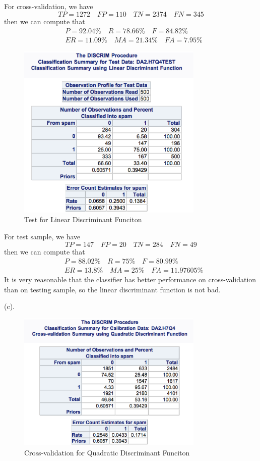 \documentclass[letterpaper, 12pt]{article}
\newcommand{\ba}{$$\begin{aligned}}
\newcommand{\ea}{\end{aligned}$$}
\begin{document}
For cross-validation, we have
$$
TP=1272\quad FP=110\quad TN=2374\quad FN=345
$$
then we can compute that
\ba
&P=92.04\%\quad R=78.66\%\quad F=84.82\%\\
&ER=11.09\%\quad MA=21.34\%\quad FA=7.95\%
\ea
\begin{figure}[htbp]
\centering\includegraphics[width=3.5in]{7-11.eps}
\caption{Test for Linear Discriminant Funciton}\label{11}
\end{figure}

For test sample, we have
$$
TP=147\quad FP=20\quad TN=284\quad FN=49
$$
then we can compute that
\ba
&P=88.02\%\quad R=75\%\quad F=80.99\%\\
&ER=13.8\%\quad MA=25\%\quad FA=11.97605\%
\ea
It is very reasonable that the classifier has better performance on cross-validation than on testing sample, so the linear discriminant function is not bad.

(c).\begin{figure}[htbp]
\centering\includegraphics[width=3.5in]{7-12.eps}
\caption{Cross-validation for Quadratic Discriminant Funciton}\label{12}
\end{figure}
\end{document}
